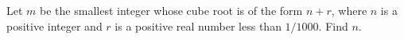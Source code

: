 Let $m$ be the smallest integer whose cube root is of the form $n+r$, where $n$ is a positive integer and $r$ is a positive real number less than $1/1000$. Find $n$.
